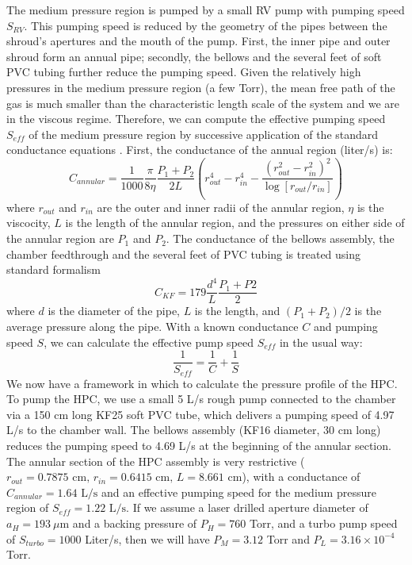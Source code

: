 The medium pressure region is pumped by a small RV pump with pumping speed $S_{RV}$. This pumping speed is reduced by the geometry of the pipes between the shroud's apertures and the mouth of the pump. First, the inner pipe and outer shroud form an annual pipe; secondly, the bellows and the several feet of soft PVC tubing further reduce the pumping speed. Given the relatively high pressures in the medium pressure region (a few Torr), the mean free path of the gas is much smaller than the characteristic length scale of the system and we are in the viscous regime. Therefore, we can compute the effective pumping speed $S_{eff}$ of the medium pressure region by successive application of the standard conductance equations \cite{hablanianHighvacuumTechnologyPractical1997,hoffmanHandbookVacuumScience1998}. First, the conductance of the annual region (liter/s) is:
\begin{equation}
C_{annular} = \frac{1}{1000} \frac{\pi}{8 \eta} \frac{P_1 + P_2}{2 L} \left( r_{out}^4 - r_{in}^4 - \frac{(r_{out}^2 - r_{in}^2)^2}{\log \left[r_{out}/r_{in}\right]} \right)
\end{equation}
where $r_{out}$ and $r_{in}$ are the outer and inner radii of the annular region, $\eta$ is the viscocity, $L$ is the length of the annular region, and the pressures on either side of the annular region are $P_1$ and $P_2$. The conductance of the bellows assembly, the chamber feedthrough and the several feet of PVC tubing is treated using standard formalism
\begin{equation}
C_{KF} = 179 \frac{d^4}{L} \frac{P_1 + P2}{2}
\end{equation}
where $d$ is the diameter of the pipe, $L$ is the length, and $(P_1 + P_2)/2$ is the average pressure along the pipe. With a known conductance $C$ and pumping speed $S$, we can calculate the effective pump speed $S_{eff}$ in the usual way:
\begin{equation}
\frac{1}{S_{eff}} = \frac{1}{C} + \frac{1}{S}
\end{equation}
We now have a framework in which to calculate the pressure profile of the HPC. To pump the HPC, we use a small 5 L/s rough pump connected to the chamber via a 150 cm long KF25 soft PVC tube, which delivers a pumping speed of 4.97 L/s to the chamber wall. The bellows assembly (KF16 diameter, 30 cm long) reduces the pumping speed to 4.69 L/s at the beginning of the annular section. The annular section of the HPC assembly is very restrictive ($r_{out} = 0.7875 \textrm{ cm, } r_{in} = 0.6415 \textrm{ cm, } L = 8.661 \textrm{ cm}$), with a conductance of $C_{annular} = 1.64 \textrm{ L/s}$ and an effective pumping speed for the medium pressure region of $S_{eff} = 1.22 \textrm{ L/s}$. If we assume a laser drilled aperture diameter of $a_H = 193 \ \mu$m and a backing pressure of $P_H = 760$ Torr, and a turbo pump speed of $S_{turbo} = 1000$ Liter/s, then we will have $P_M = 3.12$ Torr and $P_L = 3.16 \times 10^{-4}$ Torr.

